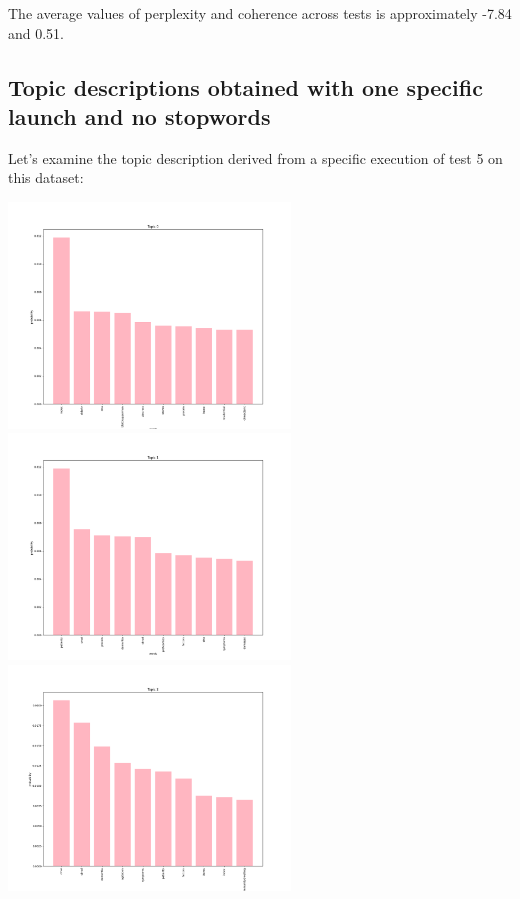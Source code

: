 \documentclass[10pt]{article} %
\begin{document}
	The average values of perplexity and coherence across tests is approximately -7.84 and 0.51. 
	
	\subsection{Topic descriptions obtained with one specific launch and no stopwords}
	
	Let's examine the topic description derived from a specific execution of test 5 on this dataset:
	
	\begin{center}
		\includegraphics[width=7.5cm]{images/plots/test_5_no_stopwords_dataset_2/topic_0.png}
		\includegraphics[width=7.5cm]{images/plots/test_5_no_stopwords_dataset_2/topic_1.png}
		\includegraphics[width=7.5cm]{images/plots/test_5_no_stopwords_dataset_2/topic_2.png}

\end{center}
\end{document}

